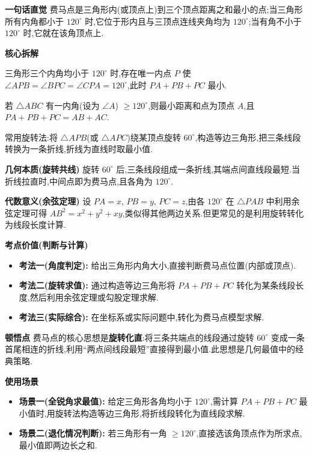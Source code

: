 \begin{explanationbox}
	\textbf{\textcolor{CExplanation}{一句话直觉}}
	费马点是三角形内(或顶点上)到三个顶点距离之和最小的点;当三角形所有内角都小于 $120^\circ$ 时,它位于形内且与三顶点连线夹角均为 $120^\circ$;当有角不小于 $120^\circ$ 时,它就在该角顶点上.

	\medskip
	\textbf{\textcolor{CExplanation}{核心拆解}}
	\begin{description}[style=nextline, leftmargin=2.8em, labelsep=0.5em, itemsep=0.45em]
		\item[\textbf{要点一(全锐角内部):}]
			三角形三个内角均小于 $120^\circ$ 时,存在唯一内点 $P$ 使 $\angle APB=\angle BPC=\angle CPA=120^\circ$,此时 $PA+PB+PC$ 最小.
		\item[\textbf{要点二(钝角退化):}]
			若 $\triangle ABC$ 有一内角(设为 $\angle A$) $\ge 120^\circ$,则最小距离和点为顶点 $A$,且 $PA+PB+PC=AB+AC$.
		\item[\textbf{要点三(构造方法):}]
			常用旋转法:将 $\triangle APB$(或 $\triangle APC$)绕某顶点旋转 $60^\circ$,构造等边三角形,把三条线段转换为一条折线,折线为直线时取最小值.
	\end{description}

	\medskip
	\textbf{\textcolor{CExplanation}{几何本质(旋转共线)}}
	旋转 $60^\circ$ 后,三条线段组成一条折线,其端点间直线段最短.当折线拉直时,中间点即为费马点,且各角为 $120^\circ$.

	\medskip
	\textbf{\textcolor{CExplanation}{代数意义(余弦定理)}}
	设 $PA=x$, $PB=y$, $PC=z$,由各 $120^\circ$ 在 $\triangle PAB$ 中利用余弦定理可得 $AB^2=x^2+y^2+xy$,类似得其他两边关系.但更常见的是利用旋转转化为线段长度计算.

	\medskip
	\textbf{\textcolor{CExplanation}{考点价值(判断与计算)}}
	\begin{itemize}[leftmargin=*, itemsep=0.5em, topsep=0.4em]
		\item \textbf{考法一(角度判定):} 给出三角形内角大小,直接判断费马点位置(内部或顶点).
		\item \textbf{考法二(旋转求值):} 通过构造等边三角形将 $PA+PB+PC$ 转化为某条线段长度,然后利用余弦定理或勾股定理求解.
		\item \textbf{考法三(实际综合):} 在坐标系或实际问题中,转化为费马点模型求解.
	\end{itemize}

	\medskip
	\textbf{\textcolor{CExplanation}{顿悟点}}
	费马点的核心思想是\textbf{旋转化直}:将三条共端点的线段通过旋转 $60^\circ$ 变成一条首尾相连的折线,利用“两点间线段最短”直接得到最小值.此思想是几何最值中的经典策略.

	\medskip
	\textbf{\textcolor{CExplanation}{使用场景}}
	\begin{itemize}[leftmargin=*, itemsep=0.5em, topsep=0.4em]
		\item \textbf{场景一(全锐角求最值):} 给定三角形各角均小于 $120^\circ$,需计算 $PA+PB+PC$ 最小值时,用旋转法构造等边三角形,将折线段转化为直线段求解.
		\item \textbf{场景二(退化情况判断):} 若三角形有一角 $\ge 120^\circ$,直接选该角顶点作为所求点,最小值即两边长之和.
	\end{itemize}

\end{explanationbox}
